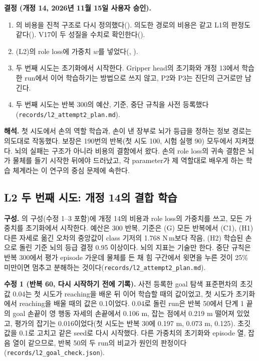 \documentclass[11pt]{article}\usepackage[margin=1in]{geometry}\usepackage{amsmath,amssymb,amsthm,mathtools}\usepackage{graphicx}\graphicspath{{figures/}{../figures/}{figs/}{./}}\usepackage{enumitem}\usepackage{hyperref}\usepackage{cleveref}\usepackage{tikz}\usetikzlibrary{arrows.meta,positioning,calc,shapes.geometric}\usepackage{float}\usepackage{rotating}\usepackage[most]{tcolorbox}\usepackage{kotex}\usepackage{booktabs}\usepackage{longtable}\emergencystretch=1.6em\tolerance=2000 \crefname{assumption}{Assumption}{Assumptions}\Crefname{assumption}{Assumption}{Assumptions}\crefname{definition}{Definition}{Definitions}\Crefname{definition}{Definition}{Definitions}\crefname{proposition}{Proposition}{Propositions}\Crefname{proposition}{Proposition}{Propositions}\crefname{fact}{Fact}{Facts}\Crefname{fact}{Fact}{Facts} \newtheorem{assumption}{Assumption}\newtheorem{definition}{Definition}\newtheorem{lemma}{Lemma}\newtheorem{proposition}{Proposition}\newtheorem{theorem}{Theorem}\newtheorem{corollary}{Corollary}\newtheorem{fact}{Fact}\theoremstyle{remark}\newtheorem{remark}{Remark} \newcommand{\R}{\mathbb{R}}\newcommand{\xb}{\bar x}\newcommand{\Ab}{\bar A}\newcommand{\By}{\bar B_y}\newcommand{\U}{\mathcal U}\newcommand{\Z}{\mathcal Z}
\begin{document}
\textbf{결정 (개정 14, 2026년 11월 15일 사용자 승인).}
\begin{enumerate}[label=(\arabic*)]
\item {}의 비용을 진척 구조로 다시 정의했다(). 의도한 경로의 비용은 같고 L1의 판정도 같다(). V17이 두 성질을 수치로 확인한다().
\item (L2)의 role loss에 가중치 $w$를 넣었다(, ).
\item 두 번째 시도는 초기화에서 시작한다. Gripper head의 초기화와 개정 13에서 학습한 run에서 이어 학습하기는 방법으로 쓰지 않고, P2와 P3는 진단의 근거로만 남긴다.
\item 두 번째 시도는 반복 300의 예산, 기준, 중단 규칙을 사전 등록했다(\texttt{records/l2\_attempt2\_plan.md}).
\end{enumerate}

\textbf{해석.} 첫 시도에서 손의 역할 학습과, 손이 낸 장부로 뇌가 등급을 정하는 정보 경로는 의도대로 작동했다. 보장은 190번의 반복(첫 시도 100, 시험 실행 90) 모두에서 지켜졌다. 뇌의 실패는 구조가 아니라 비용의 결함에서 왔다. 손의 role loss의 귀속 결함은 뇌가 물체를 들기 시작한 뒤에야 드러났고, 각 parameter가 제 역할대로 배우게 하는 학습 체계라는 이 연구의 중심 문제에 속한다.

\subsection{L2 두 번째 시도: 개정 14의 결합 학습}
\label{sec:l2a2}

\textbf{구성.} 의 구성(수정 1--3 포함)에 개정 14의 비용과 role loss의 가중치를 쓰고, 모든 가중치를 초기화에서 시작한다. 예산은 300 반복, 기준은 (G) 모든 반복에서 (C1), (H1) 다른 자세로 옮긴 오차의 중앙값이 class 기저의 1.768 N\,m보다 작음, (H2) 학습된 손으로 돌린 기준 뇌의 등급 결정 0.95 이상이다. 뇌의 지표는 기술만 한다. 중단 규칙은 반복 300에서 평가 episode 가운데 물체를 든 채 힘 구간에서 윗면을 누른 것이 25\% 미만이면 멈추고 분해하는 것이다(\texttt{records/l2\_attempt2\_plan.md}).

\textbf{수정 1 (반복 60, 다시 시작하기 전에 기록).} 사전 등록한 goal 탐색 표준편차의 초깃값 0.04는 첫 시도가 reaching을 배운 뒤 이어 학습할 때의 값이었고, 첫 시도가 초기화에서 reaching을 배울 때의 값은 0.1이었다. 0.04로 돌린 run은 반복 50에서 단계 1 끝의 goal 손끝이 영 행동 자세의 손끝에서 0.106 m, 잡는 점에서 0.219 m 떨어져 있었고, 평가의 잡기는 0.016이었다(첫 시도는 반복 30에 0.197 m, 0.073 m, 0.125). 초깃값을 0.1로 고치고 같은 seed로 다시 시작했다. 다른 가중치의 초기화와 episode 열, 잡음 열이 같으므로, 반복 50의 두 run의 비교가 원인의 판정이다(\texttt{records/l2\_goal\_check.json}).
\end{document}
